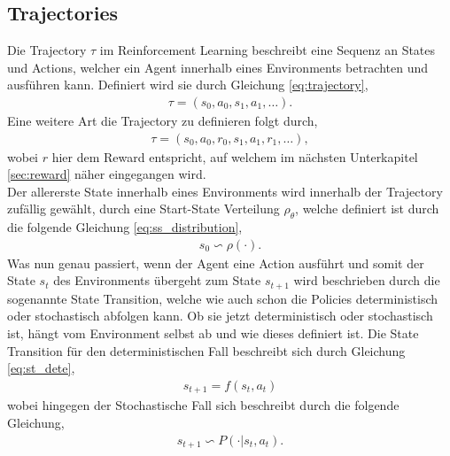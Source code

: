 \documentclass[]{iat}
\begin{document}
\subsection{Trajectories}
Die Trajectory $\tau$ im Reinforcement Learning beschreibt eine Sequenz an States und Actions, welcher ein Agent innerhalb eines Environments betrachten und ausführen kann. Definiert wird sie durch Gleichung \ref{eq:trajectory},
\begin{align}
    \tau = (s_0, a_0, s_1, a_1, \dots) \label{eq:trajectory}.
\end{align}
Eine weitere Art die Trajectory zu definieren folgt durch,
\begin{align}
    \tau = (s_0, a_0, r_0, s_1, a_1, r_1, \dots) \label{eq:trajectory_r},
\end{align}
wobei $r$ hier dem Reward entspricht, auf welchem im nächsten Unterkapitel \ref{sec:reward} näher eingegangen wird.\\
Der allererste State innerhalb eines Environments wird innerhalb der Trajectory zufällig gewählt, durch eine Start-State Verteilung $\rho_{\theta}$, welche definiert ist durch die folgende Gleichung \ref{eq:ss_distribution},
\begin{align}
    s_0 \backsim \rho(\cdot) \label{eq:ss_distribution}.
\end{align}
Was nun genau passiert, wenn der Agent eine Action ausführt und somit der State $s_t$ des Environments übergeht zum State $s_{t+1}$ wird beschrieben durch die sogenannte State Transition, welche wie auch schon die Policies deterministisch oder stochastisch abfolgen kann. Ob sie jetzt deterministisch oder stochastisch ist, hängt vom Environment selbst ab und wie dieses definiert ist. Die State Transition für den deterministischen Fall beschreibt sich durch Gleichung \ref{eq:st_dete},\begin{align}
    s_{t+1} = f(s_t, a_t) \label{eq:st_dete}
\end{align}
wobei hingegen der Stochastische Fall sich beschreibt durch die folgende Gleichung,
\begin{align}
    s_{t+1} \backsim P(\cdot | s_t, a_t) \label{eq:st_stoch}.
\end{align}
\end{document}

